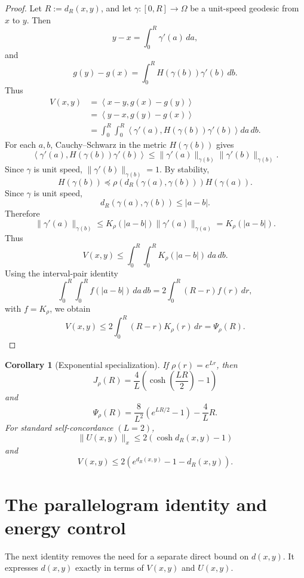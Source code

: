 \documentclass[11pt]{article}
\newtheorem{corollary}{Corollary}
\newcommand{\ip}[2]{\left\langle #1,#2\right\rangle}
\begin{document}
\begin{proof}
Let \(R:=d_R(x,y)\), and let \(\gamma:[0,R]\to\Omega\) be a unit-speed geodesic from \(x\) to \(y\). Then
\[
    y-x=\int_0^R \gamma'(a)\,da,
\]
and
\[
    g(y)-g(x)
    =
    \int_0^R H(\gamma(b))\gamma'(b)\,db.
\]
Thus
\[
\begin{aligned}
    V(x,y)
    &=
    \ip{x-y}{g(x)-g(y)} \\
    &=
    \ip{y-x}{g(y)-g(x)} \\
    &=
    \int_0^R\int_0^R
    \left\langle
        \gamma'(a),
        H(\gamma(b))\gamma'(b)
    \right\rangle
    da\,db.
\end{aligned}
\]
For each \(a,b\), Cauchy--Schwarz in the metric \(H(\gamma(b))\) gives
\[
    \left\langle
        \gamma'(a),
        H(\gamma(b))\gamma'(b)
    \right\rangle
    \le
    \|\gamma'(a)\|_{\gamma(b)}
    \|\gamma'(b)\|_{\gamma(b)}.
\]
Since \(\gamma\) is unit speed, \(\|\gamma'(b)\|_{\gamma(b)}=1\). By stability,
\[
    H(\gamma(b))
    \preceq
    \rho(d_R(\gamma(a),\gamma(b)))H(\gamma(a)).
\]
Since \(\gamma\) is unit speed,
\[
    d_R(\gamma(a),\gamma(b))\le |a-b|.
\]
Therefore
\[
    \|\gamma'(a)\|_{\gamma(b)}
    \le
    K_\rho(|a-b|)\|\gamma'(a)\|_{\gamma(a)}
    =K_\rho(|a-b|).
\]
Thus
\[
    V(x,y)
    \le
    \int_0^R\int_0^R K_\rho(|a-b|)\,da\,db.
\]
Using the interval-pair identity
\[
    \int_0^R\int_0^R f(|a-b|)\,da\,db
    =
    2\int_0^R(R-r)f(r)\,dr,
\]
with \(f=K_\rho\), we obtain
\[
    V(x,y)
    \le
    2\int_0^R(R-r)K_\rho(r)\,dr
    =
    \Psi_\rho(R).
\]
\end{proof}


\begin{corollary}[Exponential specialization]\label{cor:exp-stability-formulas}
If \(\rho(r)=e^{Lr}\), then
\[
    J_\rho(R)=\frac{4}{L}\left(\cosh\left(\frac{LR}{2}\right)-1\right)
\]
and
\[
    \Psi_\rho(R)=\frac{8}{L^2}\left(e^{LR/2}-1\right)-\frac{4}{L}R.
\]
For standard self-concordance \((L=2)\),
\[
    \|U(x,y)\|_x\le 2\left(\cosh d_R(x,y)-1\right)
\]
and
\[
    V(x,y)\le 2\left(e^{d_R(x,y)}-1-d_R(x,y)\right).
\]
\end{corollary}

\section{The parallelogram identity and energy control}

The next identity removes the need for a separate direct bound on \(d(x,y)\). It expresses \(d(x,y)\) exactly in terms of \(V(x,y)\) and \(U(x,y)\).
\end{document}
